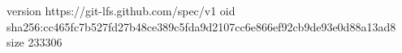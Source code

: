 version https://git-lfs.github.com/spec/v1
oid sha256:cc465fc7b527fd27b48ce389c5fda9d2107cc6e866ef92cb9de93e0d88a13ad8
size 233306
